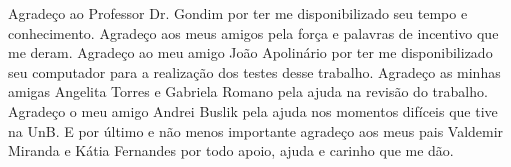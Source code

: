 Agradeço ao Professor Dr. Gondim por ter me disponibilizado seu tempo e conhecimento. Agradeço aos meus amigos pela força e palavras de incentivo que me deram. Agradeço ao meu amigo João Apolinário por ter me disponibilizado seu computador para a realização dos testes desse trabalho. Agradeço as minhas amigas Angelita Torres e Gabriela Romano pela ajuda na revisão do trabalho. Agradeço o meu amigo Andrei Buslik pela ajuda nos momentos difíceis que tive na UnB. E por último e não menos importante agradeço aos meus pais Valdemir Miranda e Kátia Fernandes por todo apoio, ajuda e carinho que me dão. 